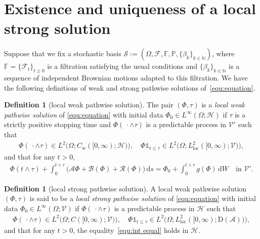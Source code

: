 \documentclass[11pt, reqno]{amsart}
\theoremstyle{definition}
\newtheorem{definition}[theorem]{Definition}
\numberwithin{equation}{section}
\newcommand{\bb}{\mathbb}
\newcommand{\ds}{\mathrm{d}s}
\newcommand{\dW}{\mathrm{d}W}
\newcommand{\one}{\mathds{1}}
\begin{document}
%


\section{Existence and uniqueness of a local strong solution}\label{sec:loc sol}

Suppose that we fix a stochastic basis $\mathcal{S}:=(\Omega, \mathcal{F}, \mathbb{F}, \mathbb{P}, \{\beta_k\}_{k\in \bb{N}})$, where $\bb{F}= \{\mathcal{F}_t\}_{t\geq 0}$ is a filtration satisfying the usual conditions and $\{\beta_k\}_{k\in \bb{N}}$ is a sequence of independent Brownian motions adapted to this filtration. We have the following definitions of weak and strong pathwise solutions of~\eqref{equ:equation}.

\begin{definition}[local weak pathwise solution]\label{def:weak sol}
The pair $(\Phi,\tau)$ is a \emph{local weak pathwise solution} of \eqref{equ:equation} with initial data $\Phi_0\in L^\infty(\Omega;\mathcal{H})$ if $\tau$ is a strictly positive stopping time and $\Phi(\,\cdot\wedge \tau)$ is a predictable process in $\mathcal{V}'$ such that
\begin{align}\label{equ:reg local weak}
	\Phi(\,\cdot\wedge \tau)\in L^2\big(\Omega; C_\mathrm{w}([0,\infty); \mathcal{H})\big), 
	\quad
	\Phi \one_{t\leq \tau} \in L^2\big(\Omega; L^2_{\mathrm{loc}}([0,\infty); \mathcal{V})\big),
\end{align}
and that for any $t>0$,
\begin{align}\label{equ:int equal}
	\Phi(t\wedge\tau) + \int_0^{t\wedge\tau} \big(\mathcal{A}\Phi+ \mathcal{B}(\Phi) + \mathcal{R}(\Phi)\big)\, \ds
	=
	\Phi_0 + \int_0^{t\wedge\tau} g(\Phi)\, \dW \quad \text{in $\mathcal{V}'$}.
\end{align}
\end{definition}

\begin{definition}[local strong pathwise solution]\label{def:strong sol}
A local weak pathwise solution $(\Phi,\tau)$ is said to be a \emph{local strong pathwise solution} of \eqref{equ:equation} with initial data $\Phi_0\in L^\infty(\Omega;\mathcal{V})$ if $\Phi(\,\cdot\wedge \tau)$ is a predictable process in $\mathcal{H}$ such that
\begin{align}\label{equ:reg local strong}
	\Phi(\,\cdot\wedge \tau)\in L^2\big(\Omega; C([0,\infty); \mathcal{V})\big), 
	\quad
	\Phi \one_{t\leq \tau} \in L^2\big(\Omega; L^2_{\mathrm{loc}}([0,\infty); \mathrm{D}(\mathcal{A}))\big),
\end{align}
and that for any $t>0$, the equality~\eqref{equ:int equal} {holds} in $\mathcal{H}$.
\end{definition}
\end{document}
